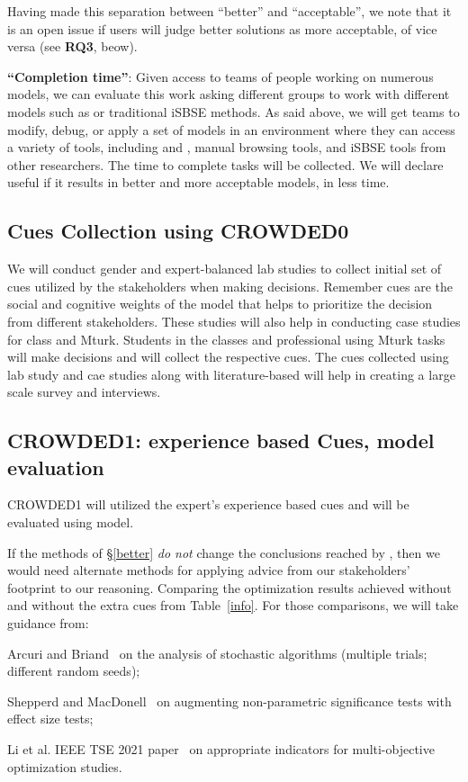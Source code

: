  Having made this separation between
 ``better'' and ``acceptable'',
 we note that it is an open issue
 if users will judge better solutions
 as more acceptable, of vice versa (see
 {\bf RQ3}, beow).
 
 {\bf ``Completion time''}: Given access to teams of people working on numerous models, we can evaluate this work asking different groups to work with different models such as {\ITTT} or traditional iSBSE methods. As said above, we will get teams to modify, debug, or apply a set of models in an environment where they can access a variety of tools, including {\ITTT} and {\ITT}, manual browsing tools, and iSBSE tools from other researchers.  The time to complete tasks will be collected. We will declare {\ITTT} useful if it results in better and more acceptable models, in less time.


\subsection{Cues Collection using CROWDED0}
We will conduct gender and expert-balanced lab studies to collect initial set of cues utilized by the stakeholders when making decisions. Remember cues are the social and cognitive weights of the model that helps to prioritize the decision from different stakeholders. These studies will also help in conducting case studies for class and Mturk. Students in the classes and professional using Mturk tasks will make decisions and will collect the respective cues. The cues collected using lab study and cae studies along with literature-based will help in creating a large scale survey and interviews.
\subsection{CROWDED1: experience based Cues, model evaluation}
CROWDED1 will utilized the expert's experience based cues and will be evaluated using model. 

If the methods of \S\ref{better} {\em do not} change the conclusions reached  by {\IT}, then we would need alternate methods for applying advice from our stakeholders' footprint to our reasoning. Comparing the optimization results achieved without and without the extra cues from Table~\ref{info}. For those comparisons, we will take  guidance from:
\bi
\item Arcuri and Briand~\cite{Arcuri11} on the analysis of stochastic algorithms  (multiple trials;    different random   seeds);
\item Shepperd and  MacDonell~\cite{SHEPPERD2012820}  on augmenting
 non-parametric significance tests with effect size tests;
 \item
 Li et al.   IEEE TSE 2021 paper~\cite{li20} on   appropriate indicators for  multi-objective optimization studies.
 \ei

